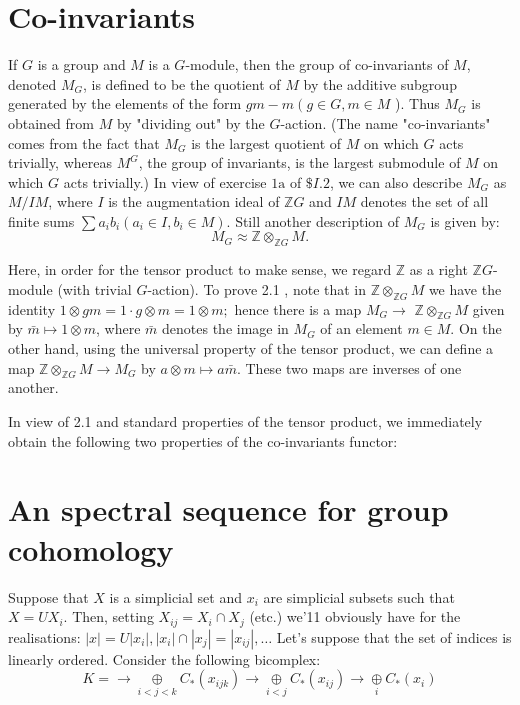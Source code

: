\section{Co-invariants}
If $G$ is a group and $M$ is a $G$-module, then the group of co-invariants of $M$, denoted $M_G$, is defined to be the quotient of $M$ by the additive subgroup generated by the elements of the form $g m-m\left(g \in G, m \in M\right.$ ). Thus $M_G$ is obtained from $M$ by "dividing out" by the $G$-action. (The name "co-invariants" comes from the fact that $M_G$ is the largest quotient of $M$ on which $G$ acts trivially, whereas $M^G$, the group of invariants, is the largest submodule of $M$ on which $G$ acts trivially.) In view of exercise $1 \mathrm{a}$ of $\$ I .2$, we can also describe $M_G$ as $M / I M$, where $I$ is the augmentation ideal of $\mathbb{Z} G$ and $I M$ denotes the set of all finite sums $\sum a_i b_i\left(a_i \in I, b_i \in M\right)$.
Still another description of $M_G$ is given by:
$$
M_G \approx \mathbb{Z} \otimes_{\mathbb{Z} G} M .
$$

Here, in order for the tensor product to make sense, we regard $\mathbb{Z}$ as a right $\mathbb{Z} G$-module (with trivial $G$-action). To prove 2.1 , note that in $\mathbb{Z} \otimes_{\mathbb{Z} G} M$ we have the identity $1 \otimes g m=1 \cdot g \otimes m=1 \otimes m ;$ hence there is a map $M_G \rightarrow$ $\mathbb{Z} \otimes_{\mathbb{Z} G} M$ given by $\bar{m} \mapsto 1 \otimes m$, where $\bar{m}$ denotes the image in $M_G$ of an element $m \in M$. On the other hand, using the universal property of the tensor product, we can define a map $\mathbb{Z} \otimes_{\mathbb{Z} G} M \rightarrow M_G$ by $a \otimes m \mapsto a \bar{m}$. These two maps are inverses of one another.

In view of 2.1 and standard properties of the tensor product, we immediately obtain the following two properties of the co-invariants functor:




\section{An spectral sequence for group cohomology}

Suppose that $X$ is a simplicial set and $x_i$ are simplicial subsets such that $X=U X_i$. Then, setting $X_{i j}=X_i \cap X_j$ (etc.) we'11 obviously have for the realisations: $|x|=U\left|x_i\right|,\left|x_i\right| \cap\left|x_j\right|=\left|x_{i j}\right|, \ldots$ Let's suppose that the set of indices is linearly ordered. Consider the following bicomplex:
$$ K = \longrightarrow \underset{i<j<k}{\oplus} C_*\left(x_{i j k}\right) \longrightarrow \underset{i<j}{\oplus} C_*\left(x_{i j}\right)\longrightarrow \underset{i}{\oplus} C_*\left(x_{i}\right) $$


